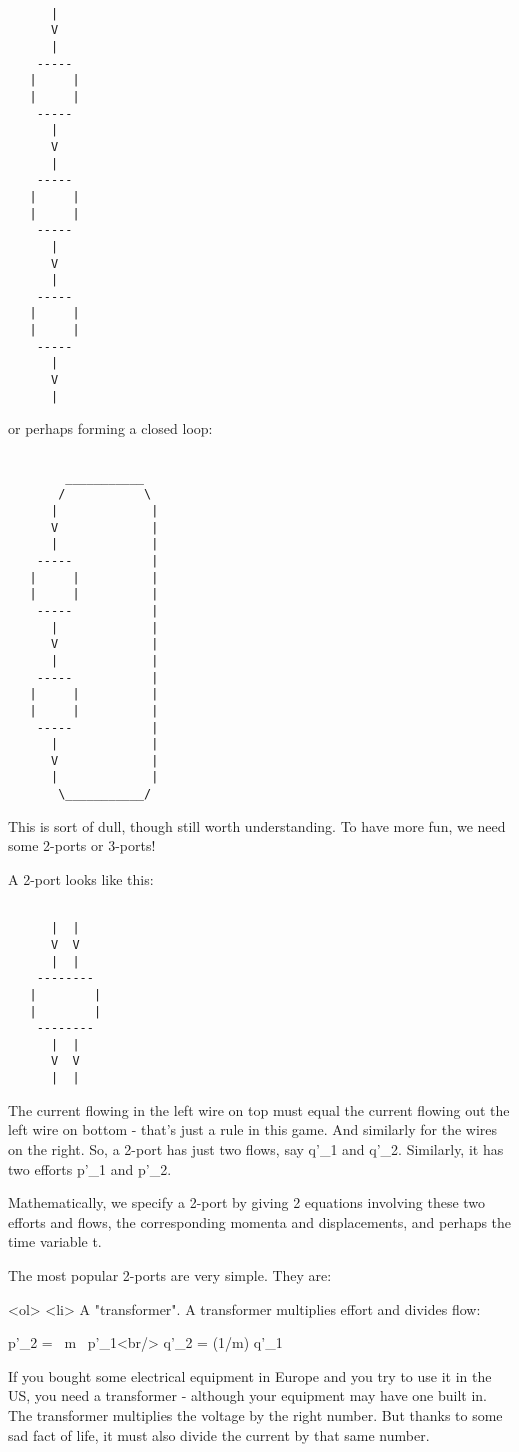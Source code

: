 \begin{verbatim}

      |
      V
      |
    -----
   |     |
   |     |
    -----
      |
      V
      |
    -----
   |     |
   |     |
    -----
      |
      V
      |
    -----
   |     |
   |     |
    -----
      |
      V
      |
\end{verbatim}
    

or perhaps forming a closed loop:


\begin{verbatim}

        ___________
       /           \
      |             |
      V             |
      |             |
    -----           |
   |     |          |
   |     |          |
    -----           |
      |             |
      V             |
      |             |
    -----           |
   |     |          |
   |     |          |
    -----           |
      |             |
      V             |
      |             |
       \___________/

\end{verbatim}
    

This is sort of dull, though still worth understanding.  To have more
fun, we need some 2-ports or 3-ports!

A 2-port looks like this:


\begin{verbatim}

      |  |
      V  V
      |  |
    --------
   |        |
   |        |
    --------
      |  |
      V  V
      |  |
\end{verbatim}
    

The current flowing in the left wire on top must equal the current
flowing out the left wire on bottom - that's just a rule in this game.
And similarly for the wires on the right.  So, a 2-port has just two
flows, say q'_{1} and q'_{2}.  Similarly, it has two
efforts p'_{1} and p'_{2}.

Mathematically, we specify a 2-port by giving 2 equations involving 
these two efforts and flows, the corresponding momenta and 
displacements, and perhaps the time variable t.

The most popular 2-ports are very simple.  They are:

<ol>
<li>
A "transformer".  A transformer multiplies effort and divides
  flow:

  p'_{2} =  \  m \   p'_{1}<br/>
  q'_{2} = (1/m) q'_{1}

 If you bought some electrical equipment in Europe and you try to
 use it in the US, you need a transformer - although your equipment 
 may have one built in.  The transformer multiplies the voltage
 by the right number.  But thanks to some sad fact of life, it must
 also divide the current by that same number.  

